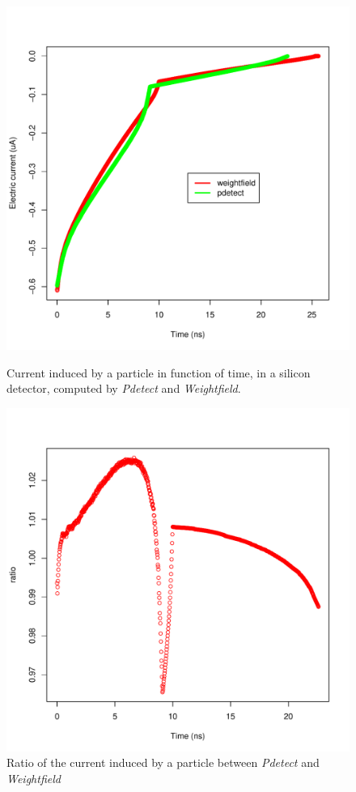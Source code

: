\documentclass[11pt]{article}
\begin{document}
				\begin{figure}[H]
					\begin{minipage}[b]{.46\linewidth}
						\center
						\includegraphics[scale=0.5]{images/applications/silicon_current.pdf}
						\caption{Current induced by a particle in function of time, in a silicon detector, computed by
								\textit{Pdetect} and \textit{Weightfield}.}
						\label{fig:silicon}
					\end{minipage} \hfill
					\begin{minipage}[b]{.46\linewidth}
						\center
						\includegraphics[scale=0.5]{images/applications/silicon_ratio.pdf}
						\caption{Ratio of the current induced by a particle between \textit{Pdetect} and
								\textit{Weightfield}}
						\label{fig:silicon_ratio}
					\end{minipage}
				\end{figure}
\end{document}
